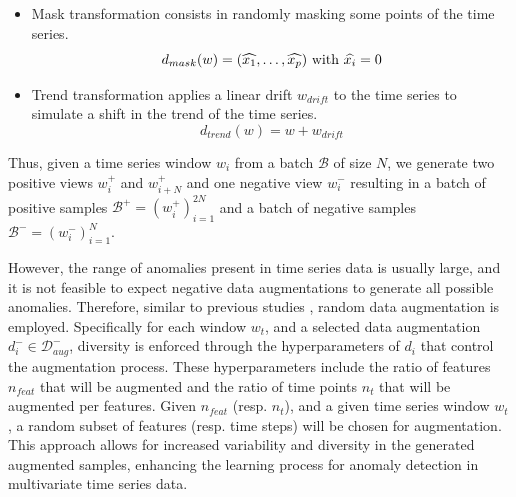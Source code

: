 \begin{itemize}
    \item Mask transformation consists in randomly masking some points of the time series.
        \begin{equation}
            d_{mask}(w) = (\widehat{x_1}, \ldots, \widehat{x_p}) \\
            \text{ with } \widehat{x_i} = 0
        \end{equation}
    \item Trend transformation applies a linear drift $w_{drift}$ to the time series to simulate a shift in the trend of the time series.
        \begin{equation}
            d_{trend}(w) = w + w_{drift}
        \end{equation}
\end{itemize}

Thus, given a time series window $w_i$ from a batch $\mathcal{B}$ of size $N$, we generate two positive views $w_i^{+}$ and $w_{i+N}^{+}$ and one negative view $w_i^{-}$ resulting in a batch of positive samples $\mathcal{B}^{+} = (w_i^{+})_{i=1}^{2N}$ and a batch of negative samples $\mathcal{B}^{-} = (w_i^{-})_{i=1}^{N}$.

However, the range of anomalies present in time series data is usually large, and it is not feasible to expect negative data augmentations to generate all possible anomalies. Therefore, similar to previous studies \cite{DARBAN2025110874, kim2023contrastive, li2023contrastive}, random data augmentation is employed. Specifically for each window $w_t$, and a selected data augmentation $d_i^- \in \mathcal{D}_{aug}^{-}$, diversity is enforced through the hyperparameters of $d_i$ that control the augmentation process. These hyperparameters include the ratio of features $n_{feat}$ that will be augmented and the ratio of time points $n_{t}$ that will be augmented per features. Given $n_{feat}$ (resp. $n_{t}$), and a given time series window $w_t$, a random subset of features (resp. time steps) will be chosen for augmentation. This approach allows for increased variability and diversity in the generated augmented samples, enhancing the learning process for anomaly detection in multivariate time series data.

